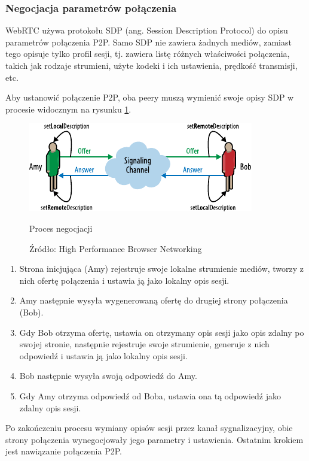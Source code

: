 \subsubsection{Negocjacja parametrów połączenia}
\label{negotiation}

WebRTC używa protokołu SDP (ang. Session Description Protocol) do opisu parametrów połączenia P2P.
Samo SDP nie zawiera żadnych mediów, zamiast tego opisuje tylko profil sesji, tj. zawiera listę
różnych właściwości połączenia, takich jak rodzaje strumieni, użyte kodeki i ich ustawienia,
prędkość transmisji, etc.

Aby ustanowić połączenie P2P, oba peery muszą wymienić swoje opisy SDP w procesie widocznym na
rysunku \ref{fig:signaling2}.

\begin{figure}[H]
    \centering
    \includegraphics{img/signaling-2}
    \caption{Proces negocjacji}
    \caption*{Źródło: High Performance Browser Networking\cite{hpbn}}
    \label{fig:signaling2}
\end{figure}

\begin{enumerate}
    \item Strona inicjująca (Amy) rejestruje swoje lokalne strumienie mediów, tworzy z nich ofertę
          połączenia i ustawia ją jako lokalny opis sesji.
    \item Amy następnie wysyła wygenerowaną ofertę do drugiej strony połączenia (Bob).
    \item Gdy Bob otrzyma ofertę, ustawia on otrzymany opis sesji jako opis zdalny po swojej
          stronie, następnie rejestruje swoje strumienie, generuje z nich odpowiedź i ustawia ją jako
          lokalny opis sesji.
    \item Bob następnie wysyła swoją odpowiedź do Amy.
    \item Gdy Amy otrzyma odpowiedź od Boba, ustawia ona tą odpowiedź jako zdalny opis sesji.
\end{enumerate}

Po zakończeniu procesu wymiany opisów sesji przez kanał sygnalizacyjny, obie strony połączenia
wynegocjowały jego parametry i ustawienia. Ostatnim krokiem jest nawiązanie połączenia P2P.

